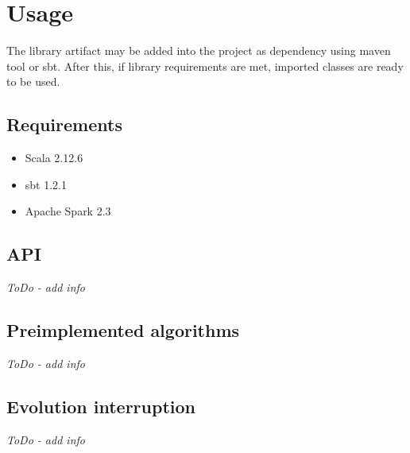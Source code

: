 \section{Usage}
The library artifact may be added into the project as dependency using maven tool or sbt. After this, if library requirements are met, imported classes are ready to be used.

\subsection{Requirements}
\begin{itemize}
\item Scala 2.12.6
\item sbt 1.2.1
\item Apache Spark 2.3

\end{itemize}

\bigbreak
\subsection{API}

\textit{ToDo - add info}

\subsection{Preimplemented algorithms}
\textit{ToDo - add info}

\subsection{Evolution interruption}
\textit{ToDo - add info}